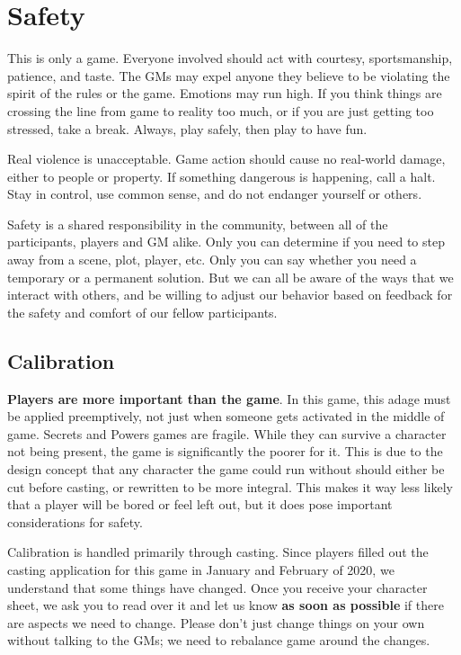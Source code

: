\documentclass[sheet]{GL2020}
\begin{document}
\section{Safety}
This is only a game.  Everyone involved should act with courtesy, sportsmanship, patience, and taste.  The GMs may expel anyone they believe to be violating the spirit of the rules or the game.  Emotions may run high.  If you think things are crossing the line from game to reality too much, or if you are just getting too stressed, take a break. Always, play safely, then play to have fun. 

Real violence is unacceptable. Game action should cause no real-world damage, either to people or property.  If something dangerous is happening, call a halt.  Stay in control, use common sense, and do not endanger yourself or others.

Safety is a shared responsibility in the community, between all of the participants, players and GM alike. Only you can determine if you need to step away from a scene, plot, player, etc. Only you can say whether you need a temporary or a permanent solution. But we can all be aware of the ways that we interact with others, and be willing to adjust our behavior based on feedback for the safety and comfort of our fellow participants.

\subsection{Calibration}
\textbf{Players are more important than the game}. In this game, this adage must be applied preemptively, not just when someone gets activated in the middle of game. Secrets and Powers games are fragile. While they can survive a character not being present, the game is significantly the poorer for it. This is due to the design concept that any character the game could run without should either be cut before casting, or rewritten to be more integral. This makes it way less likely that a player will be bored or feel left out, but it does pose important considerations for safety.

Calibration is handled primarily through casting. Since players filled out the casting application for this game in January and February of 2020, we understand that some things have changed. Once you receive your character sheet, we ask you to read over it and let us know \textbf{as soon as possible} if there are aspects we need to change. Please don’t just change things on your own without talking to the GMs; we need to rebalance game around the changes.
\end{document}
